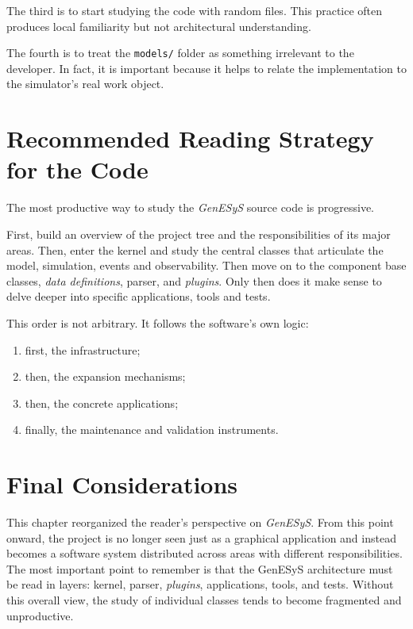 The third is to start studying the code with random files. This practice often produces local familiarity but not architectural understanding.

The fourth is to treat the \texttt{models/} folder as something irrelevant to the developer. In fact, it is important because it helps to relate the implementation to the simulator's real work object.

\section{Recommended Reading Strategy for the Code}
\label{sec:cap6_estrategia_recomendada_leitura}

The most productive way to study the \textit{GenESyS} source code is progressive.

First, build an overview of the project tree and the responsibilities of its major areas. Then, enter the kernel and study the central classes that articulate the model, simulation, events and observability. Then move on to the component base classes, \textit{data definitions}, parser, and \textit{plugins}. Only then does it make sense to delve deeper into specific applications, tools and tests.

This order is not arbitrary. It follows the software’s own logic:
\begin{enumerate}
 \item first, the infrastructure;
 \item then, the expansion mechanisms;
 \item then, the concrete applications;
 \item finally, the maintenance and validation instruments.
\end{enumerate}

\section{Final Considerations}
\label{sec:cap6_consideracoes_finais}

This chapter reorganized the reader's perspective on \textit{GenESyS}. From this point onward, the project is no longer seen just as a graphical application and instead becomes a software system distributed across areas with different responsibilities. The most important point to remember is that the GenESyS architecture must be read in layers: kernel, parser, \textit{plugins}, applications, tools, and tests. Without this overall view, the study of individual classes tends to become fragmented and unproductive.

